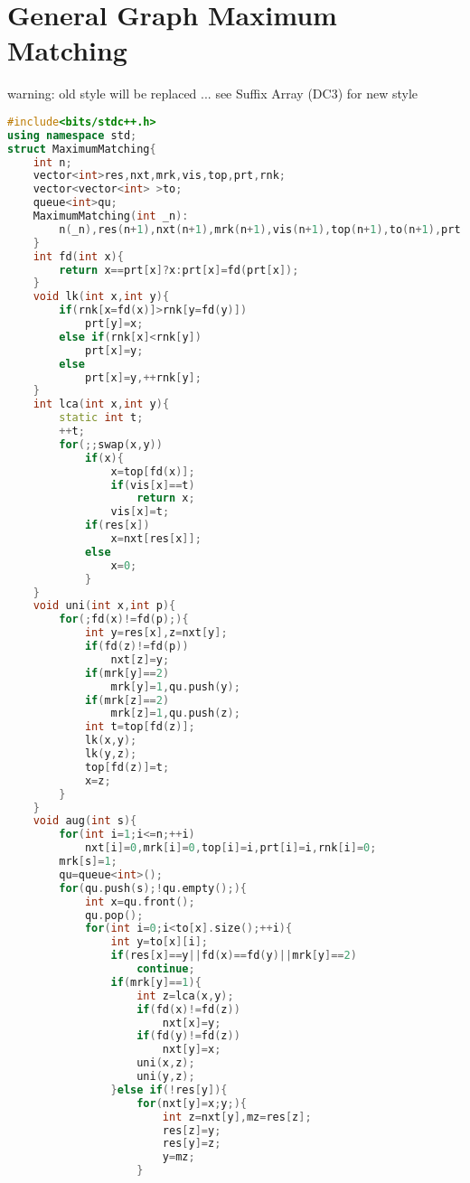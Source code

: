 \documentclass{book}
\begin{document}
\section{General Graph Maximum Matching}
warning: old style will be replaced ... see Suffix Array (DC3) for new style\begin{lstlisting}[language=C++,title={General Graph Maximum Matching.hpp (3123 bytes, 112 lines)}]
#include<bits/stdc++.h>
using namespace std;
struct MaximumMatching{
    int n;
    vector<int>res,nxt,mrk,vis,top,prt,rnk;
    vector<vector<int> >to;
    queue<int>qu;
    MaximumMatching(int _n):
        n(_n),res(n+1),nxt(n+1),mrk(n+1),vis(n+1),top(n+1),to(n+1),prt(n+1),rnk(n+1){
    }
    int fd(int x){
        return x==prt[x]?x:prt[x]=fd(prt[x]);
    }
    void lk(int x,int y){
        if(rnk[x=fd(x)]>rnk[y=fd(y)])
            prt[y]=x;
        else if(rnk[x]<rnk[y])
            prt[x]=y;
        else
            prt[x]=y,++rnk[y];
    }
    int lca(int x,int y){
        static int t;
        ++t;
        for(;;swap(x,y))
            if(x){
                x=top[fd(x)];
                if(vis[x]==t)
                    return x;
                vis[x]=t;
            if(res[x])
                x=nxt[res[x]];
            else
                x=0;
            }
    }
    void uni(int x,int p){
        for(;fd(x)!=fd(p);){
            int y=res[x],z=nxt[y];
            if(fd(z)!=fd(p))
                nxt[z]=y;
            if(mrk[y]==2)
                mrk[y]=1,qu.push(y);
            if(mrk[z]==2)
                mrk[z]=1,qu.push(z);
            int t=top[fd(z)];
            lk(x,y);
            lk(y,z);
            top[fd(z)]=t;
            x=z;
        }
    }
    void aug(int s){
        for(int i=1;i<=n;++i)
            nxt[i]=0,mrk[i]=0,top[i]=i,prt[i]=i,rnk[i]=0;
        mrk[s]=1;
        qu=queue<int>();
        for(qu.push(s);!qu.empty();){
            int x=qu.front();
            qu.pop();
            for(int i=0;i<to[x].size();++i){
                int y=to[x][i];
                if(res[x]==y||fd(x)==fd(y)||mrk[y]==2)
                    continue;
                if(mrk[y]==1){
                    int z=lca(x,y);
                    if(fd(x)!=fd(z))
                        nxt[x]=y;
                    if(fd(y)!=fd(z))
                        nxt[y]=x;
                    uni(x,z);
                    uni(y,z);
                }else if(!res[y]){
                    for(nxt[y]=x;y;){
                        int z=nxt[y],mz=res[z];
                        res[z]=y;
                        res[y]=z;
                        y=mz;
                    }

\end{lstlisting}
\end{document}
